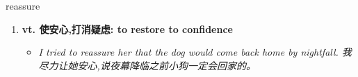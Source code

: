 
\begin{frame}
{\huge reassure}
\begin{center}
\begin{enumerate}\Large
  \item \textbf{vt. 使安心,打消疑虑: to restore to confidence}
  \begin{itemize}
    \item \em{\Large{I tried to reassure her that the dog would come back home by nightfall. 我尽力让她安心,说夜幕降临之前小狗一定会回家的。}}
  \end{itemize}
\end{enumerate}
\end{center}
\end{frame}
